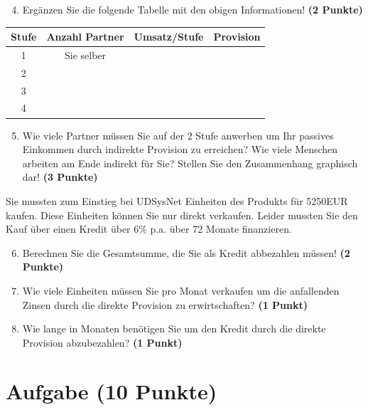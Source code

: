 \documentclass[a4paper, 9pt]{scrartcl}\usepackage[]{graphicx}\usepackage[]{xcolor}
\begin{document}
\begin{enumerate}
  \setcounter{enumi}{3}
\item Erg{\"a}nzen Sie die folgende Tabelle mit den obigen Informationen! \textbf{(2 Punkte)}
\end{enumerate}

\begin{center}
\begin{tabular}{c|c|c|c}
  \toprule
  \textbf{Stufe} & \textbf{Anzahl Partner}  & \textbf{Umsatz/Stufe} & \textbf{Provision}\\
  \midrule
  1 & Sie selber  &  & \\ \midrule
  2 &   &  &  \\ \midrule
  3 &   &  &  \\ \midrule
  4 &   &  &  \\
  \bottomrule
\end{tabular}
\end{center}

\begin{enumerate}
  \setcounter{enumi}{4}
\item Wie viele Partner m{\"u}ssen Sie auf der 2 Stufe anwerben um Ihr passives
  Einkommen durch indirekte Provision zu erreichen? Wie viele Menschen
  arbeiten am Ende indirekt f{\"u}r Sie? Stellen Sie den
  Zusammenhang graphisch dar!  \textbf{(3 Punkte)}
\end{enumerate}

Sie mussten zum Einstieg bei UDSysNet Einheiten des Produkts
f{\"u}r 5250EUR kaufen. Diese Einheiten k{\"o}nnen Sie nur direkt
verkaufen. Leider mussten Sie den Kauf {\"u}ber einen Kredit {\"u}ber
6\% p.a. {\"u}ber 72 Monate finanzieren.

\begin{enumerate}
  \setcounter{enumi}{5}
\item Berechnen Sie die Gesamtsumme, die Sie als Kredit abbezahlen m{\"u}ssen! \textbf{(2 Punkte)}
\item Wie viele Einheiten m{\"u}ssen Sie pro Monat verkaufen um die anfallenden Zinsen
  durch die direkte Provision zu erwirtschaften? \textbf{(1 Punkt)}
\item Wie lange in
  Monaten ben{\"o}tigen Sie um den Kredit durch die direkte
  Provision abzubezahlen? \textbf{(1 Punkt)}
\end{enumerate} 
\clearpage

\section{Aufgabe \hfill (10 Punkte)}
\end{document}
